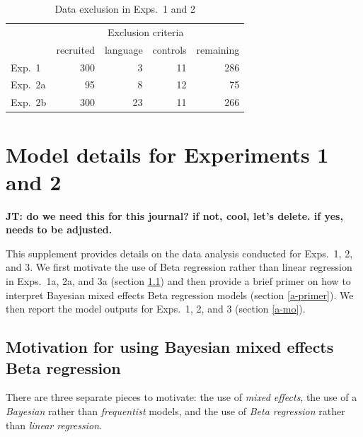 \documentclass[11pt,fleqn]{article}
\newcommand{\jt}[1]{\textbf{\color{blue}JT: #1}}
\newcommand{\6}{\mbox{$[\hspace*{-.6mm}[$}}
\newcommand{\9}{\mbox{$]\hspace*{-.6mm}]$}}
\begin{document}

\begin{table}[h!]
\centering
\begin{tabular}{l r | r r | r}
&  & \multicolumn{2}{c|}{Exclusion criteria} &  \\ 
&  recruited  & language & controls & remaining \\ 
\hline
Exp.~1 & 300 & 3 & 11 & 286 \\
Exp.~2a & 95 & 8 & 12 & 75 \\
Exp.~2b & 300 & 23 & 11 & 266 \\
\end{tabular}
\caption{Data exclusion in Exps.~1 and 2}\label{f-exclusion}
\end{table} 

\section{Model details for Experiments 1 and 2}\label{modeldetails}

\jt{do we need this for this journal? if not, cool, let's delete. if yes, needs to be adjusted.}

This supplement provides details on the data analysis conducted for Exps.~1, 2, and 3. We first motivate the use of Beta regression rather than linear regression in Exps.~1a, 2a, and 3a (section \ref{a-motivation}) and then provide a brief primer on how to interpret Bayesian mixed effects Beta regression models (section \ref{a-primer}). We then report the model outputs for Exps.~1, 2, and 3 (section \ref{a-mo}).

\subsection{Motivation for using Bayesian mixed effects Beta regression}\label{a-motivation}

There are three separate pieces to motivate: the use of \emph{mixed effects}, the use of a \emph{Bayesian} rather than \emph{frequentist} models, and the use of \emph{Beta regression} rather than \emph{linear regression}. 
\end{document}
